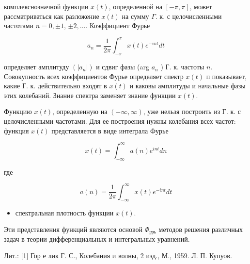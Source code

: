 \documentclass[10pt]{article}
\begin{document}
комплекснозначной функции $x(t)$, определенной на $[-\pi, \pi]$, может рассматриваться как разложение $x(t)$ на сумму $\Gamma$. к. с целочисленными частотами $n=0, \pm 1$, $\pm 2, \ldots$. Коэффициент Фурье



\[

a_{n}=\frac{1}{2 \pi} \int_{-\pi}^{\pi} x(t) e^{-i n t} d t

\]



определяет амплитуду $\left(\left|a_{n}\right|\right)$ и сдвиг фазы (arg $a_{n}$ ) Г. к. частоты $n$. Совокупность всех коэффициентов Фурье определяет спектр $x(t)$ п показывает, какие Г. к. действительно входят в $x(t)$ и каковы амплитуды и начальные фазы этих колебаний. Знание спектра заменяет знание функции $x(t)$.



Функцию $x(t)$, определенную на $(-\infty, \infty)$, уже нельзя построить из Г. к. с целочисленными частотами. Для ее построения нужны колебания всех частот: функция $x(t)$ представляется в виде интеграла Фурье



\[

x(t)=\int_{-\infty}^{\infty} a(n) e^{i n t} d n

\]



где



\[

a(n)=\frac{1}{2 \pi} \int_{-\infty}^{\infty} x(t) e^{-i n t} d t

\]



\begin{itemize}

  \item спектральная плотность функции $x(t)$.

\end{itemize}



Эти представления функций являются основой $\Phi_{y р ь}$ методов решения различных задач в теории дифференциальных и интегральных уравнений.



Лит.: [1] Гор е лик Г. С., Колебания и волны, 2 изд., М., 1959. Л. П. Купуов.
\end{document}
